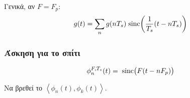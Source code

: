 \documentclass[11pt,a4paper,titlepage,fleqn]{article}
\begin{document}
    Γενικά, αν \(  F = F_p \):
    \[
    g(t) = \sum_n g(nT_s) \;\mathrm{sinc}\!\left( \frac{1}{T_s} (t-nT_s) \right)
    \]
    
    
    \subsubsection{Άσκηση για το σπίτι}
    \[
    \phi_n^{F,T_s}(t) = \;\mathrm{sinc}\!\left(  F(t-nF_p) \right)
    \]
    
    Να βρεθεί το \( \left\langle \phi_n(t),\phi_k(t)\right\rangle \).
\end{document}
